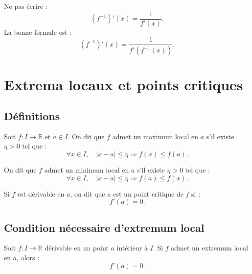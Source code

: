 \documentclass[11pt,a4paper]{article}
\newcommand{\R}{\mathbb R}
\newcommand{\implique}{\Longrightarrow}
\begin{document}
\begin{erreurbox}
Ne pas écrire :
\[
(f^{-1})'(x)=\frac1{f'(x)}.
\]
La bonne formule est :
\[
(f^{-1})'(x)=\frac1{f'(f^{-1}(x))}.
\]
\end{erreurbox}

\section{Extrema locaux et points critiques}

\subsection{Définitions}

\begin{definitionbox}
Soit \(f:I\to\R\) et \(a\in I\).  
On dit que \(f\) admet un maximum local en \(a\) s'il existe \(\eta>0\) tel que :
\[
\forall x\in I,\quad |x-a|\leq\eta\implique f(x)\leq f(a).
\]
\end{definitionbox}

\begin{definitionbox}
On dit que \(f\) admet un minimum local en \(a\) s'il existe \(\eta>0\) tel que :
\[
\forall x\in I,\quad |x-a|\leq\eta\implique f(a)\leq f(x).
\]
\end{definitionbox}

\begin{definitionbox}
Si \(f\) est dérivable en \(a\), on dit que \(a\) est un point critique de \(f\) si :
\[
f'(a)=0.
\]
\end{definitionbox}

\subsection{Condition nécessaire d'extremum local}

\begin{theorembox}
Soit \(f:I\to\R\) dérivable en un point \(a\) intérieur à \(I\).  
Si \(f\) admet un extremum local en \(a\), alors :
\[
f'(a)=0.
\]
\end{theorembox}
\end{document}
